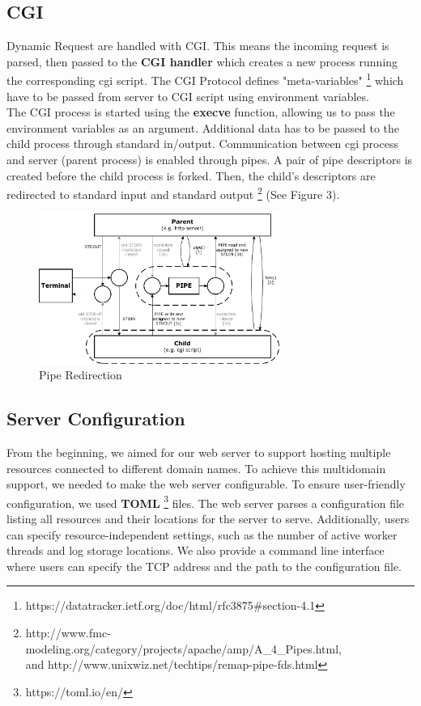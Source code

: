 \subsection*{CGI}
Dynamic Request are handled with CGI. This means the incoming request is parsed, then passed to the \textbf{CGI handler} which creates a new process running the corresponding cgi script. The CGI Protocol defines "meta-variables" \footnote{https://datatracker.ietf.org/doc/html/rfc3875#section-4.1} which have to be passed from server to CGI script using environment variables. \\

The CGI process is started using the \textbf{execve} function, allowing us to pass the environment variables as an argument. Additional data has to be passed to the child process through standard in/output. 
Communication between cgi process and server (parent process) is enabled through pipes. A pair of pipe descriptors is created before the child process is forked. Then, the child's descriptors are redirected to standard input and standard output \footnote{http://www.fmc-modeling.org/category/projects/apache/amp/A\_4\_Pipes.html, \\ and http://www.unixwiz.net/techtips/remap-pipe-fds.html } (See Figure 3).

\begin{figure}[h]
	\centering
	\includegraphics[width=0.7\textwidth]{figures/Pipes_BD.pdf}
	\caption{Pipe Redirection} %
\end{figure}

\subsection*{Server Configuration}
From the beginning, we aimed for our web server to support hosting multiple resources connected to different domain names. To achieve this multidomain support, we needed to make the web server configurable. To ensure user-friendly configuration, we used \textbf{TOML} \footnote{https://toml.io/en/} files. The web server parses a configuration file listing all resources and their locations for the server to serve. Additionally, users can specify resource-independent settings, such as the number of active worker threads and log storage locations. We also provide a command line interface where users can specify the TCP address and the path to the configuration file.

